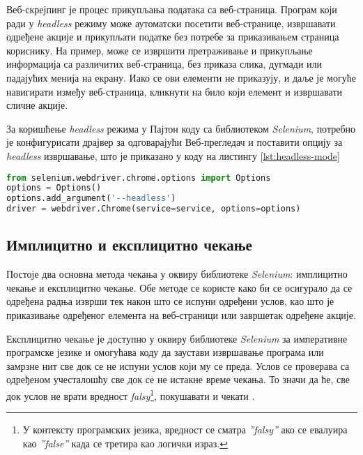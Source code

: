 \documentclass[12pt,oneside]{memoir}
\begin{document}
Веб-скрејпинг је процес прикупљања података са веб-страница. Програм који ради у \textit{headless} режиму може аутоматски посетити веб-странице, извршавати одређене акције и прикупљати податке без потребе за приказивањем страница кориснику. На пример, може се извршити претраживање и прикупљање информација са различитих веб-страница, без приказа слика, дугмади или падајућих менија на екрану. Иако се ови елементи не приказују, и даље је могуће навигирати између веб-страница, кликнути на било који елемент и извршавати сличне акције.

За коришћење \textit{headless} режима у Пајтон коду са библиотеком  \textit{Selenium}, потребно је конфигурисати драјвер за одговарајући Веб-прегледач и поставити опцију за \textit{headless} извршавање, што је приказано у коду на листингу \ref{lst:headless-mode} 
\begin{lstlisting}[language=Python, caption={Омогућавање \textit{headless} режима}, label={lst:headless-mode}]
from selenium.webdriver.chrome.options import Options
options = Options()
options.add_argument('--headless')
driver = webdriver.Chrome(service=service, options=options)
\end{lstlisting}

\subsection{Имплицитно и експлицитно чекање}
Постоје два основна метода чекања у оквиру библиотеке \textit{Selenium}: 
имплицитно чекање и експлицитно чекање. Обе методе се користе како би се осигурало да се одређена радња изврши тек након што се испуни одређени услов, као што је приказивање одређеног елемента на веб-страници или завршетак одређене акције.

Експлицитно чекање је доступно у оквиру библиотеке \textit{Selenium} за императивне програмске језике и омогућава коду да заустави извршавање програма или замрзне нит све док се не испуни услов који му се преда. Услов се проверава са одређеном учесталошћу све док се не истакне време чекања. То значи да ће, све док услов не врати вредност \textit{falsy}\footnote{
У контексту програмских језика, вредност се сматра \textit{''falsy''} ако се евалуира као \textit{''false''} када се третира као логички израз.
}, покушавати и чекати \cite{selenium}.
\end{document}
